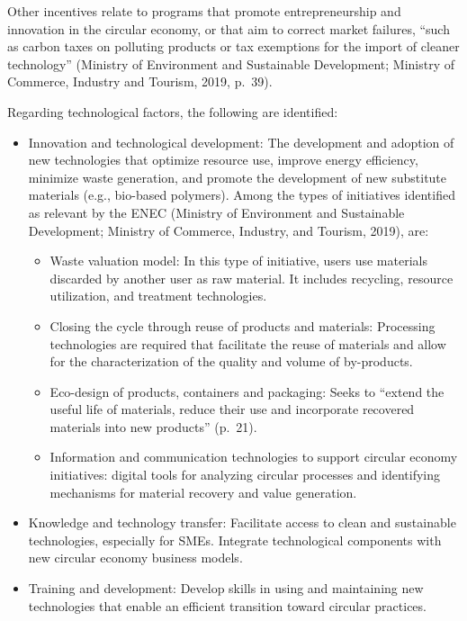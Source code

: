 \documentclass[
  12pt,
  oneside]{book}
\providecommand{\tightlist}{%
  \setlength{\itemsep}{0pt}\setlength{\parskip}{0pt}}
\begin{document}
Other incentives relate to programs that promote entrepreneurship and
innovation in the circular economy, or that aim to correct market
failures, ``such as carbon taxes on polluting products or tax exemptions
for the import of cleaner technology'' (Ministry of Environment and
Sustainable Development; Ministry of Commerce, Industry and Tourism,
2019, p.~39).

Regarding technological factors, the following are identified:

\begin{itemize}
\tightlist
\item
  Innovation and technological development: The development and adoption
  of new technologies that optimize resource use, improve energy
  efficiency, minimize waste generation, and promote the development of
  new substitute materials (e.g., bio-based polymers). Among the types
  of initiatives identified as relevant by the ENEC (Ministry of
  Environment and Sustainable Development; Ministry of Commerce,
  Industry, and Tourism, 2019), are:

  \begin{itemize}
  \tightlist
  \item
    Waste valuation model: In this type of initiative, users use
    materials discarded by another user as raw material. It includes
    recycling, resource utilization, and treatment technologies.
  \item
    Closing the cycle through reuse of products and materials:
    Processing technologies are required that facilitate the reuse of
    materials and allow for the characterization of the quality and
    volume of by-products.
  \item
    Eco-design of products, containers and packaging: Seeks to ``extend
    the useful life of materials, reduce their use and incorporate
    recovered materials into new products'' (p.~21).
  \item
    Information and communication technologies to support circular
    economy initiatives: digital tools for analyzing circular processes
    and identifying mechanisms for material recovery and value
    generation.
  \end{itemize}
\item
  Knowledge and technology transfer: Facilitate access to clean and
  sustainable technologies, especially for SMEs. Integrate technological
  components with new circular economy business models.
\item
  Training and development: Develop skills in using and maintaining new
  technologies that enable an efficient transition toward circular
  practices.
\end{itemize}
\end{document}
